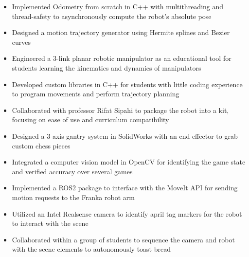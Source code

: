 \documentclass[10pt,a4paper,ragged2e,withhyper]{altacv}
\begin{document}
    \begin{itemize}
        \item Implemented Odometry from scratch in C++ with multithreading and thread-safety to asynchronously compute the robot's absolute pose
        \item Designed a motion trajectory generator using Hermite splines and Bezier curves
    \end{itemize}
    \begin{itemize}
        \item Engineered a 3-link planar robotic manipulator as an educational tool for students learning the kinematics and dynamics of manipulators
        \item Developed custom libraries in C++ for students with little coding experience to program movements and perform trajectory planning
        \item Collaborated with professor Rifat Sipahi to package the robot into a kit, focusing on ease of use and curriculum compatibility 
    \end{itemize}
    \begin{itemize}
        \item Designed a 3-axis gantry system in SolidWorks with an end-effector to grab custom chess pieces
        \item Integrated a computer vision model in OpenCV for identifying the game state and verified accuracy over several games
    \end{itemize}
    \begin{itemize}
        \item Implemented a ROS2 package to interface with the MoveIt API for sending motion requests to the Franka robot arm
        \item Utilized an Intel Realsense camera to identify april tag markers for the robot to interact with the scene
        \item Collaborated within a group of students to sequence the camera and robot with the scene elements to autonomously toast bread
    \end{itemize}
\end{document}
